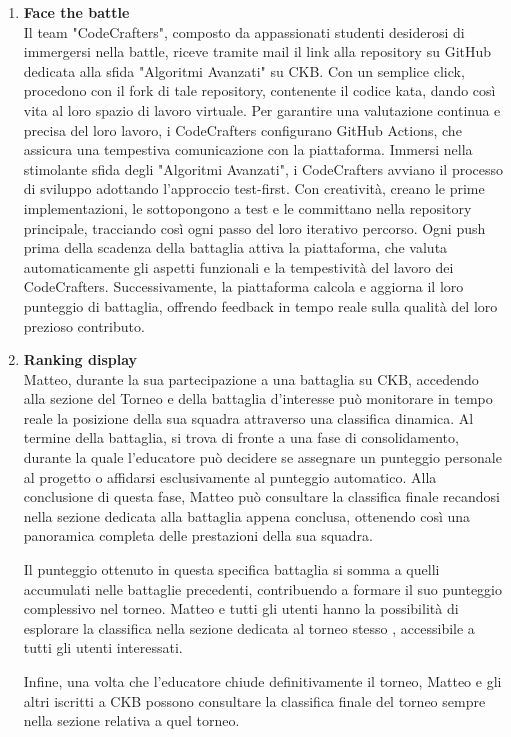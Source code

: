 \begin{enumerate}[label=\textbf{\Alph*}.]
\item  \textbf{Face the battle} \\
Il team "CodeCrafters", composto da appassionati studenti desiderosi di immergersi nella battle, riceve tramite mail il link alla repository su GitHub dedicata alla sfida "Algoritmi Avanzati" su CKB. Con un semplice click, procedono con il fork di tale repository, contenente il codice kata, dando così vita al loro spazio di lavoro virtuale. Per garantire una valutazione continua e precisa del loro lavoro, i CodeCrafters configurano GitHub Actions, che assicura una tempestiva comunicazione con la piattaforma.
Immersi nella stimolante sfida degli "Algoritmi Avanzati", i CodeCrafters avviano il processo di sviluppo adottando l'approccio test-first. Con creatività, creano le prime implementazioni, le sottopongono a test e le committano nella repository principale, tracciando così ogni passo del loro iterativo percorso. Ogni push prima della scadenza della battaglia attiva la piattaforma, che valuta automaticamente gli aspetti funzionali e la tempestività del lavoro dei CodeCrafters. Successivamente, la piattaforma calcola e aggiorna il loro punteggio di battaglia, offrendo feedback in tempo reale sulla qualità del loro prezioso contributo.
\item \textbf{Ranking display} \\
Matteo, durante la sua partecipazione a una battaglia su CKB, accedendo alla sezione del Torneo e della battaglia d'interesse può monitorare in tempo reale la posizione della sua squadra attraverso una classifica dinamica. Al termine della battaglia, si trova di fronte a una fase di consolidamento, durante la quale l'educatore può decidere se assegnare un punteggio personale al progetto o affidarsi esclusivamente al punteggio automatico. Alla conclusione di questa fase, Matteo può consultare la classifica finale  recandosi nella sezione dedicata alla battaglia appena conclusa, ottenendo così una panoramica completa delle prestazioni della sua squadra.

Il punteggio ottenuto in questa specifica battaglia si somma a quelli accumulati nelle battaglie precedenti, contribuendo a formare il suo punteggio complessivo nel torneo. Matteo e tutti gli utenti hanno la possibilità di esplorare la classifica nella sezione dedicata al torneo stesso , accessibile a tutti gli utenti interessati.

Infine, una volta che l'educatore chiude definitivamente il torneo, Matteo e gli altri iscritti a CKB possono consultare la classifica finale del torneo sempre nella sezione relativa a quel torneo.


\end{enumerate}
